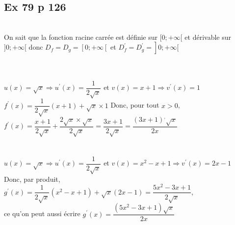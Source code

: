 \documentclass[12pt,a5paper]{book}
\begin{document}
\subsection*{Ex 79 p 126}
\begin{enumMet}
    \item {}\\
    On sait que la fonction racine carrée est définie sur $[0 ;+\infty[$ et dérivable sur $] 0 ;+\infty[$ donc $D_{f}=D_{g}=\left[0 ;+\infty\left[\right.\right.$ et $\left.\left.D_{f}^{\prime}=D_{g}^{\prime}=\right] 0 ;+\infty[\right.$
    \item {}\\
    \\
$u(x)=\sqrt{x} \Rightarrow u^{\prime}(x)=\dfrac{1}{2 \sqrt{x}} \text { et } v(x)=x+1 \Rightarrow v^{\prime}(x)=1$\\
$f^{\prime}(x)=\dfrac{1}{2 \sqrt{x}}(x+1)+\sqrt{x} \times 1$
Donc, pour tout $x>0$,\\
$f^{\prime}(x)=\dfrac{x+1}{2 \sqrt{x}}+\dfrac{2 \sqrt{x} \times \sqrt{x}}{2 \sqrt{x}}=\dfrac{3 x+1}{2 \sqrt{x}}=\dfrac{(3 x+1)^{,} \sqrt{x}}{2 x}$\\
\ \\
\\
$u(x)=\sqrt{x} \Rightarrow u^{\prime}(x)=\dfrac{1}{2 \sqrt{x}}$ et $v(x)=x^{2}-x+1 \Rightarrow v^{\prime}(x)=2 x-1$\\
Donc, par produit,\\
$g^{\prime}(x)=\dfrac{1}{2 \sqrt{x}}\left(x^{2}-x+1\right)+\sqrt{x}(2 x-1)=\dfrac{5 x^{2}-3 x+1}{2 \sqrt{x}}$,\\
ce qu'on peut aussi écrire
$g^{\prime}(x)=\dfrac{\left(5 x^{2}-3 x+1\right) \sqrt{x}}{2 x}$
\end{enumMet}
\end{document}
